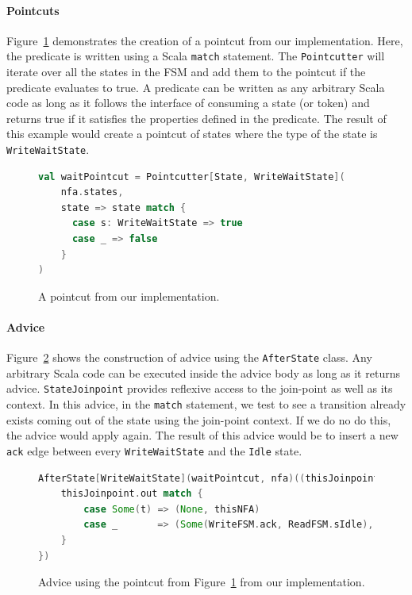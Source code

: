 \documentclass[conference]{IEEEtran}
\begin{document}
\paragraph{Pointcuts}
Figure~\ref{fig:pointcut} demonstrates the creation of a pointcut from our implementation. Here, the predicate is written using a Scala \texttt{match} statement. The \texttt{Pointcutter} will iterate over all the states in the FSM and add them to the pointcut if the predicate evaluates to true. A predicate can be written as any arbitrary Scala code as long as it follows the interface of consuming a state (or token) and returns true if it satisfies the properties defined in the predicate. The result of this example would create a pointcut of states where the type of the state is \texttt{WriteWaitState}.

\begin{figure}[ht]
    \centering
    \begin{lstlisting}[language = Scala]
val waitPointcut = Pointcutter[State, WriteWaitState](
    nfa.states,
    state => state match {
      case s: WriteWaitState => true
      case _ => false
    }
)
    \end{lstlisting}
    \caption{A pointcut from our implementation.}
    \label{fig:pointcut}
\end{figure}

\paragraph{Advice}
Figure~\ref{fig:advice} shows the construction of advice using the \texttt{AfterState} class. Any arbitrary Scala code can be executed inside the advice body as long as it returns advice. \texttt{StateJoinpoint} provides reflexive access to the join-point as well as its context. In this advice, in the \texttt{match} statement, we test to see a transition already exists coming out of the state using the join-point context. If we do no do this, the advice would apply again. The result of this advice would be to insert a new \texttt{ack} edge between every \texttt{WriteWaitState} and the \texttt{Idle} state.

\begin{figure}[ht]
    \centering
    \begin{lstlisting}[language = Scala]
AfterState[WriteWaitState](waitPointcut, nfa)((thisJoinpoint: StateJoinpoint[WriteWaitState], thisNFA: NFA) => {
    thisJoinpoint.out match {
        case Some(t) => (None, thisNFA)
        case _       => (Some(WriteFSM.ack, ReadFSM.sIdle), thisNFA)
    }
})
    \end{lstlisting}
    \caption{Advice using the pointcut from Figure~\ref{fig:pointcut} from our implementation.}
    \label{fig:advice}
\end{figure}
\end{document}

